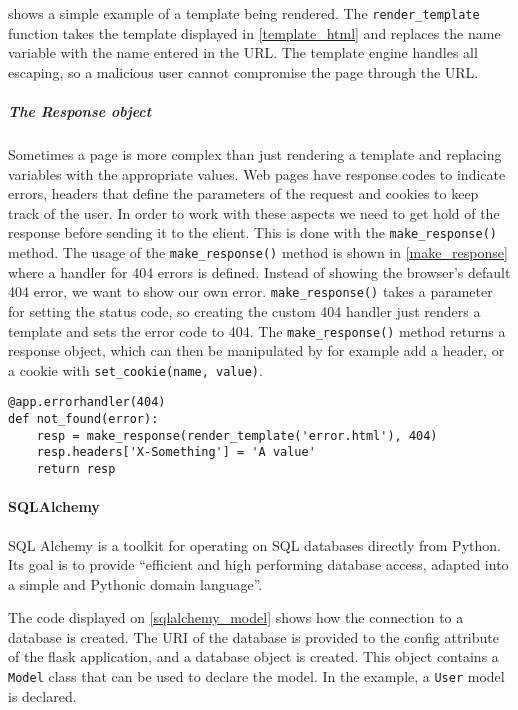  shows a simple example of a template being rendered.
The \texttt{render\_template} function takes the template displayed in \cref{template_html} and replaces the name variable with the name entered in the URL.
The template engine handles all escaping, so a malicious user cannot compromise the page through the URL.

\subparagraph{The Response object}
Sometimes a page is more complex than just rendering a template and replacing variables with the appropriate values.
Web pages have response codes to indicate errors, headers that define the parameters of the request and cookies to keep track of the user.
In order to work with these aspects we need to get hold of the response before sending it to the client.
This is done with the \texttt{make\_response()} method.
The usage of the \texttt{make\_response()} method is shown in \cref{make_response} where a handler for 404 errors is defined.
Instead of showing the browser's default 404 error, we want to show our own error.
\texttt{make\_response()} takes a parameter for setting the status code, so creating the custom 404 handler just renders a template and sets the error code to 404.
The \texttt{make\_response()} method returns a response object, which can then be manipulated by for example add a header, or a cookie with \texttt{set\_cookie(name, value)}.

\begin{lstlisting}[style=python, caption={Using make\_response to create a custom 404 handler}, label={make_response}]
@app.errorhandler(404)
def not_found(error):
    resp = make_response(render_template('error.html'), 404)
    resp.headers['X-Something'] = 'A value'
    return resp
\end{lstlisting}

\paragraph{SQLAlchemy}
SQL Alchemy is a toolkit for operating on SQL databases directly from Python.
Its goal is to provide ``efficient and high performing database access, adapted into a simple and Pythonic domain language''\citep{sqlalchemy_official}.

The code displayed on \cref{sqlalchemy_model} shows how the connection to a database is created.
The URI of the database is provided to the config attribute of the flask application, and a database object is created.
This object contains a \texttt{Model} class that can be used to declare the model.
In the example, a \texttt{User} model is declared.

